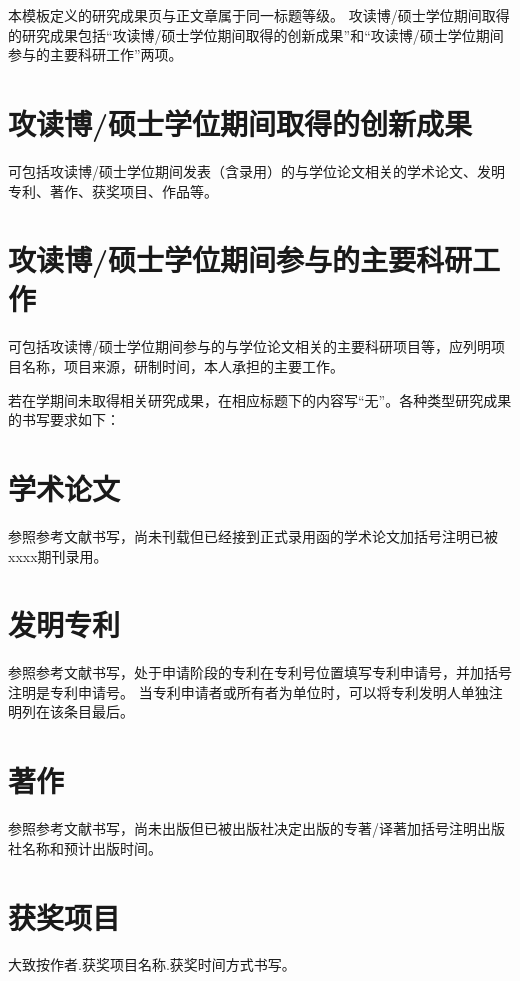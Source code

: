 \achievement

本模板定义的研究成果页与正文章属于同一标题等级。
攻读博/硕士学位期间取得的研究成果包括“攻读博/硕士学位期间取得的创新成果”和“攻读博/硕士学位期间参与的主要科研工作”两项。

\section*{攻读博/硕士学位期间取得的创新成果}

可包括攻读博/硕士学位期间发表（含录用）的与学位论文相关的学术论文、发明专利、著作、获奖项目、作品等。

\section*{攻读博/硕士学位期间参与的主要科研工作}

可包括攻读博/硕士学位期间参与的与学位论文相关的主要科研项目等，应列明项目名称，项目来源，研制时间，本人承担的主要工作。

若在学期间未取得相关研究成果，在相应标题下的内容写“无”。各种类型研究成果的书写要求如下：

\section*{学术论文}

参照参考文献书写，尚未刊载但已经接到正式录用函的学术论文加括号注明已被xxxx期刊录用。

\section*{发明专利}

参照参考文献书写，处于申请阶段的专利在专利号位置填写专利申请号，并加括号注明是专利申请号。
当专利申请者或所有者为单位时，可以将专利发明人单独注明列在该条目最后。

\section*{著作}

参照参考文献书写，尚未出版但已被出版社决定出版的专著/译著加括号注明出版社名称和预计出版时间。

\section*{获奖项目}

大致按作者.获奖项目名称.获奖时间方式书写。


